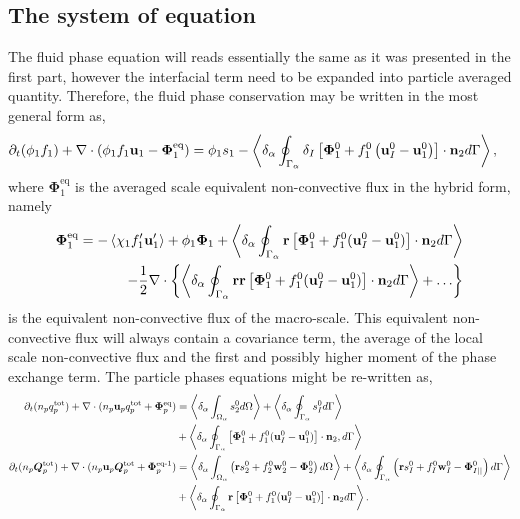 \subsection{The system of equation}


The fluid phase equation will reads essentially the same as it was presented in the first part, however the interfacial term need to be expanded into particle averaged quantity. 
Therefore, the fluid phase conservation may be written in the most general form as, 
\begin{align}
    \partial_t (\phi_1 f_1)
    +\mathbf{\nabla}\cdot (\phi_1 f_1 \textbf{u}_1  - \bm\Phi_1^\text{eq})
    &= 
    \phi_1 s_1
    - \left<\delta_\alpha \oint_{\Gamma_\alpha} \delta_I\left[
        \bm{\Phi}_1^0
        + f_1^0
        \left(
            \textbf{u}_I^0
            - \textbf{u}_1^0
        \right)
    \right]
    \cdot \textbf{n}_2 d\Gamma\right> ,
    \label{eq:dt_f_1_hybrid}
\end{align}
where $\bm\Phi_1^\text{eq}$ is the averaged scale equivalent non-convective flux in the hybrid form, namely 
\begin{align}
    \bm\Phi_1^\text{eq}
    = 
    - \left<\chi_1 f_1' \textbf{u}_1'\right>
    + \phi_1 \bm\Phi_1
    + \left<\delta_\alpha \oint_{\Gamma_\alpha} \textbf{r} \left[
        \bm{\Phi}_1^0
        + f_1^0 (\textbf{u}_I^0-\textbf{u}_1^0)
    \right]\cdot \textbf{n}_2 d\Gamma\right>\\
    - \frac{1}{2}\mathbf{\nabla}\cdot\left\{
        \left<\delta_\alpha \oint_{\Gamma_\alpha} \textbf{rr} \left[
            \bm{\Phi}_1^0
            + f_1^0 (\textbf{u}_I^0-\textbf{u}_1^0)
            \right]\cdot \textbf{n}_2 d\Gamma\right>
            +\ldots
        \right\}
\end{align}
is the equivalent non-convective flux of the macro-scale. 
This equivalent non-convective flux will always contain a covariance term, the average of the local scale non-convective flux and the first and possibly higher moment of the phase exchange term. 
The particle phases equations might be re-written as, 
\begin{align}
    \label{eq:dt_q_p_hybrid}
    \partial_t (n_p  q_p^\text{tot})
    + \mathbf{\nabla}\cdot (n_p\textbf{u}_p q_p^\text{tot} + \bm\Phi_p^\text{eq})
    &= \left<\delta_\alpha \int_{\Omega_\alpha}  s_2^0  d\Omega\right>
    + \left<\delta_\alpha \oint_{\Gamma_\alpha}  s_I^0  d\Gamma\right>\\
    &+ \left<\delta_\alpha \oint_{\Gamma_\alpha}  \left[\bm{\Phi}_1^0 + f_1^0 (\textbf{u}_I^0-\textbf{u}_1^0) \right] \cdot \textbf{n}_2 , d\Gamma\right>
    \\
    \label{eq:dt_Q_p_hybrid}
    \partial_t (n_p  \bm{Q}_p^\text{tot})
    + \mathbf{\nabla}\cdot (n_p \textbf{u}_p\bm{Q}_p^\text{tot}
    + \bm\Phi_p^\text{eq-1})
    &=\left<\delta_\alpha \int_{\Omega_\alpha}  \left(
        \textbf{r} s_2^0         
        + f_2^0  \textbf{w}_2^0 
        - \bm{\Phi}_2^0
    \right)  d\Omega\right>
    + \left<\delta_\alpha \oint_{\Gamma_\alpha}  \left(
        \textbf{r}s_I^0
        + f_I^0 \textbf{w}_I^0
        - \bm{\Phi}_{I||}^0
    \right)  d\Gamma\right>\nonumber\\
    &+ \left<\delta_\alpha \oint_{\Gamma_\alpha}  \textbf{r} \left[
        \bm{\Phi}_1^0
        + f_1^0 (\textbf{u}_I^0-\textbf{u}_1^0)
    \right]\cdot \textbf{n}_2   d\Gamma\right>.
\end{align}
